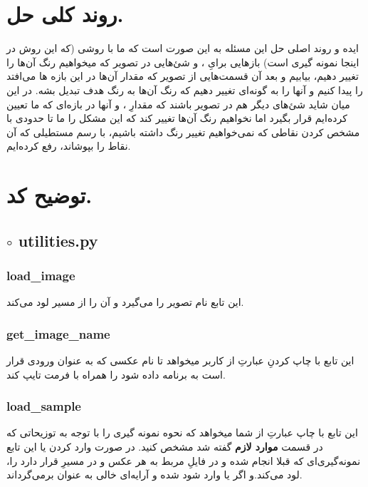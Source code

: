 \documentclass[a4paper,12pt]{article}
\begin{document}
\section*{روند کلی حل.}
ایده و روند اصلی حل این مسئله به این صورت است که ما با روشی (که این روش در اینجا نمونه گیری است) بازهایی برایِ
،
  و 
  شئ‌هایی در تصویر که میخواهیم رنگ آن‌ها را تغییر دهیم، بیابیم و بعد آن قسمت‌هایی از تصویر که مقدار آن‌ها در این بازه ها می‌افتد را پیدا کنیم و 
  آنها را به گونه‌ای تغییر دهیم که رنگ آن‌ها به رنگ هدف تبدیل بشه. در این میان شاید شئ‌های دیگر هم در تصویر باشند که مقدارِ
  ،
  و 
  آنها در بازه‌ای که ما تعیین کرده‌ایم قرار بگیرد اما نخواهیم رنگ آن‌ها تغییر کند که این مشکل را ما تا حدودی با مشخص کردن نقاطی که نمی‌خواهیم تغییر رنگ داشته باشیم، با رسم مستطیلی که آن نقاط را بپوشاند، رفع کرده‌ایم.
  

\section*{توضیح کد.}
\subsection*{$\circ$ utilities.py}

\subsubsection*{load\_image}
این تابع نام تصویر را می‌گیرد و آن را از مسیر
لود می‌کند.
\subsubsection*{get\_image\_name}
این تابع با چاپ کردنِ عبارتِ
 از کاربر میخواهد تا نام عکسی که به عنوان ورودی قرار است به برنامه داده شود را همراه با فرمت تایپ کند.
 \subsubsection*{load\_sample}
 این تابع با چاپ عبارتِ
 از شما میخواهد که نحوه نمونه گیری را با توجه به توزیحاتی که در قسمت 
 \textbf{موارد لازم}
 گفته شد مشخص کنید. در صورت وارد کردن 
 یا 
 این تابع نمونه‌گیری‌ای که قبلا انجام شده و در فایلِ مربط به هر عکس و در مسیرِ
 قرار دارد را، لود می‌کند.و اگر 
 یا
 وارد شود 
 شده و آرایه‌ای خالی به عنوان 
 برمی‌گرداند.
\end{document}
